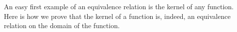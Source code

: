 An easy first example of an equivalence relation is the kernel of any function. Here is how we prove that the kernel of a function is, indeed, an equivalence relation on the domain of the function.
\ccpad
\begin{code}%
\>[1]\AgdaSpace{}%
\AgdaSymbol{:}\AgdaSpace{}%
\AgdaSymbol{(}\AgdaSpace{}%
\AgdaSymbol{:}\AgdaSpace{}%
\AgdaSpace{}%
\AgdaSpace{}%
\AgdaSymbol{)}\AgdaSpace{}%
\AgdaSpace{}%
\AgdaSpace{}%
\AgdaSymbol{(}\AgdaSymbol{\{}\AgdaSymbol{\}\{}\AgdaSymbol{\}}\AgdaSpace{}%
\AgdaSymbol{)}\<%
\\
%
\>[1]\AgdaSpace{}%
\AgdaSpace{}%
\AgdaSymbol{=}\AgdaSpace{}%
%
\>[235I]\AgdaSymbol{\{}\AgdaSpace{}%
\AgdaSpace{}%
\AgdaSymbol{=}\AgdaSpace{}%
\AgdaSpace{}%
\AgdaSpace{}%
\AgdaSpace{}%
\<%
\\
\>[.][@{}l@{}]\<[235I]%
\>[37]\AgdaSymbol{;}\AgdaSpace{}%
\AgdaSpace{}%
\AgdaSymbol{=}\AgdaSpace{}%
\AgdaSpace{}%
\AgdaSpace{}%
\AgdaSpace{}%
\AgdaSpace{}%
\AgdaSpace{}%
\AgdaSymbol{\{}\AgdaSymbol{\}}\AgdaSpace{}%
\<%
\\
%
\>[37]\AgdaSymbol{;}\AgdaSpace{}%
\AgdaSpace{}%
\AgdaSymbol{=}\AgdaSpace{}%
\AgdaSpace{}%
\AgdaSpace{}%
\AgdaSpace{}%
\AgdaSpace{}%
\AgdaSpace{}%
\AgdaSpace{}%
\AgdaSpace{}%
\AgdaSpace{}%
\AgdaSpace{}%
\AgdaSpace{}%
\AgdaSymbol{\}}\<%
\end{code}

